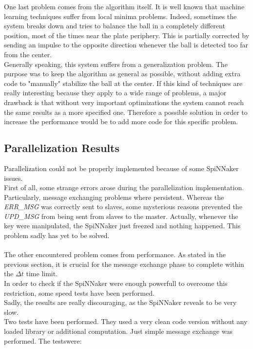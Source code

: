 \documentclass{article}
\begin{document}
One last problem comes from the algorithm itself. It is well known that machine learning techniques suffer from local minima problems. Indeed, sometimes the system breaks down and tries to balance the ball in a completely different position, most of the times near the plate periphery. This is partially corrected by sending an impulse to the opposite direction whenever the ball is detected too far from the center.\\

Generally speaking, this system suffers from a generalization problem. The purpose was to keep the algorithm as general as possible, without adding extra code to "manually" stabilize the ball at the center. If this kind of techniques are really interesting because they apply to a wide range of problems, a major drawback is that without very important optimizations the system cannot reach the same results as a more specified one. Therefore a possible solution in order to increase the performance would be to add more code for this specific problem.\\


\subsection{Parallelization Results}
Parallelization could not be properly implemented because of some SpiNNaker issues.\\

First of all, some strange errors arose during the parallelization implementation. Particularly, message exchanging problems where persistent. Whereas the \textit{ERR\_MSG} was correctly sent to slaves, some mysterious reasons prevented the \textit{UPD\_MSG} from being sent from slaves to the master. Actually, whenever the key were manipulated, the SpiNNaker just freezed and nothing happened. This problem sadly has yet to be solved.\\ \\

The other encountered problem comes from performance. As stated in the previous section, it is crucial for the message exchange phase to complete within the \(\Delta t\) time limit. \\
In order to check if the SpiNNaker were enough powerfull to overcome this restriction, some speed tests have been performed. \\
Sadly, the results are really discouraging, as the SpiNNaker reveals to be very slow. \\
Two tests have been performed. They used a very clean code version without any loaded library or additional computation. Just simple message exchange was performed. The testswere:
\end{document}
